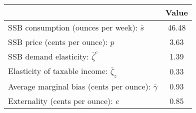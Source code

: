 \begin{tabular}{lc}
\hline
\hline
 & Value \\
\hline
SSB consumption (ounces per week): $\bar s$ & 46.48 \\
SSB price (cents per ounce): $p$ & 3.63 \\
SSB demand elasticity: $\bar\zeta^c$ & 1.39 \\
Elasticity of taxable income: $\bar\zeta_z$ & 0.33 \\
Average marginal bias (cents per ounce): $\bar\gamma$ & 0.93 \\
Externality (cents per ounce): $e$ & 0.85 \\
\hline
\hline
\end{tabular}

